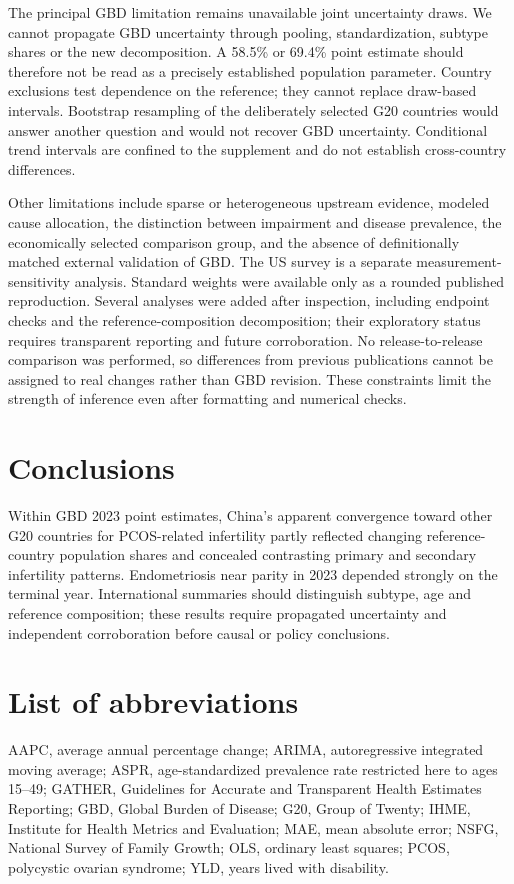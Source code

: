 \documentclass[11pt,a4paper]{article}
\begin{document}



The principal GBD limitation remains unavailable joint uncertainty draws. We cannot propagate GBD uncertainty through pooling, standardization, subtype shares or the new decomposition. A 58.5\% or 69.4\% point estimate should therefore not be read as a precisely established population parameter. Country exclusions test dependence on the reference; they cannot replace draw-based intervals. Bootstrap resampling of the deliberately selected G20 countries would answer another question and would not recover GBD uncertainty. Conditional trend intervals are confined to the supplement and do not establish cross-country differences.

Other limitations include sparse or heterogeneous upstream evidence, modeled cause allocation, the distinction between impairment and disease prevalence, the economically selected comparison group, and the absence of definitionally matched external validation of GBD. The US survey is a separate measurement-sensitivity analysis. Standard weights were available only as a rounded published reproduction. Several analyses were added after inspection, including endpoint checks and the reference-composition decomposition; their exploratory status requires transparent reporting and future corroboration. No release-to-release comparison was performed, so differences from previous publications cannot be assigned to real changes rather than GBD revision. These constraints limit the strength of inference even after formatting and numerical checks.

\section{Conclusions}
Within GBD 2023 point estimates, China's apparent convergence toward other G20 countries for PCOS-related infertility partly reflected changing reference-country population shares and concealed contrasting primary and secondary infertility patterns. Endometriosis near parity in 2023 depended strongly on the terminal year. International summaries should distinguish subtype, age and reference composition; these results require propagated uncertainty and independent corroboration before causal or policy conclusions.

\section*{List of abbreviations}
AAPC, average annual percentage change; ARIMA, autoregressive integrated moving average; ASPR, age-standardized prevalence rate restricted here to ages 15--49; GATHER, Guidelines for Accurate and Transparent Health Estimates Reporting; GBD, Global Burden of Disease; G20, Group of Twenty; IHME, Institute for Health Metrics and Evaluation; MAE, mean absolute error; NSFG, National Survey of Family Growth; OLS, ordinary least squares; PCOS, polycystic ovarian syndrome; YLD, years lived with disability.
\end{document}
